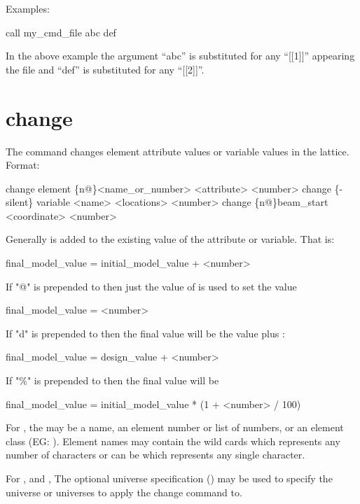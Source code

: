 Examples:
\begin{example}
    call my_cmd_file abc def 
\end{example}
In the above example the argument ``abc'' is substituted for any
``[[1]]'' appearing the file and ``def'' is substituted for any
``[[2]]''.
\Newline

\section{change}
\label{s:change}

The  command changes element attribute values or variable
values in the  lattice. Format:
\begin{example}
  change element \{n@\}<name_or_number> <attribute> <number>
  change \{-silent\} variable <name> <locations> <number>
  change  \{n@\}beam_start <coordinate> <number>
\end{example}

\vskip 0.2in 
Generally  is added to the existing value of the
attribute or variable. That is:
\begin{example}
  final_model_value = initial_model_value + <number>
\end{example}
If "@" is prepended to  then just the value of
 is used to set the value
\begin{example}
  final_model_value = <number>
\end{example}
If "d" is prepended to  then the final value will be the
 value plus :
\begin{example}
  final_model_value = design_value + <number>
\end{example}
If "\%" is prepended to  then the final value will be
\begin{example}
  final_model_value = initial_model_value * (1 + <number> / 100)
\end{example}

For , the  may be a name, an element number or
list of numbers, or an element class (EG: ). Element names
may contain the wild cards  which represents any number of characters
or can be  which represents any single character. 

For , and , The optional 
universe specification () may be used to specify the
universe or universes to apply the change command to.

